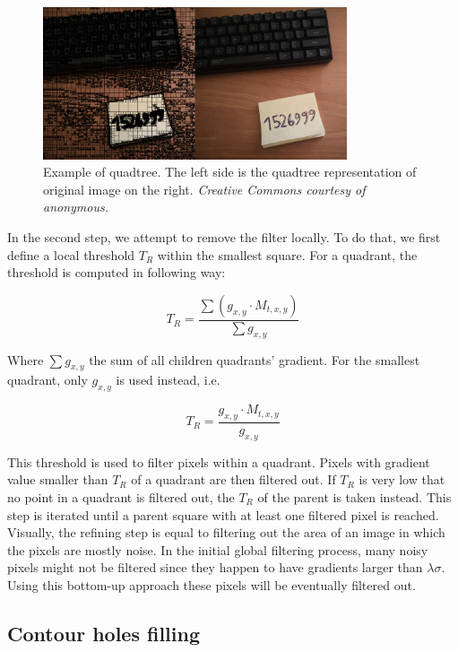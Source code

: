 \documentclass[pdftex,12pt,a4paper]{report}
\begin{document}
\begin{figure}[H]
\centering
\includegraphics[width=0.8\textwidth]{images/quadtree}
\caption[Example of quadtree]{Example of quadtree. The left side is the quadtree representation of original image on the right. \textit{Creative Commons courtesy of anonymous.}}
\label{fig:quadtree}
\end{figure}

In the second step, we attempt to remove the filter locally. To do that, we first define a local threshold $T_R$ within the smallest square. For a quadrant, the threshold is computed in following way:

\begin{equation}
T_R = \frac{\sum ( g_{x,y} \cdot M_{t, x, y} )}{\sum g_{x, y}}
\label{eq:local_threshold_rats}
\end{equation}

Where $\sum g_{x,y}$ the sum of all children quadrants' gradient. For the smallest quadrant, only $g_{x,y}$ is used instead, i.e.

\begin{equation}
T_R = \frac{g_{x,y} \cdot M_{t, x, y}}{g_{x, y}}
\label{eq:local_threshold_rats_smallest}
\end{equation}

This threshold is used to filter pixels within a quadrant. Pixels with gradient value smaller than $T_R$ of a quadrant are then filtered out. If $T_R$ is very low that no point in a quadrant is filtered out, the $T_R$ of the parent is taken instead. This step is iterated until a parent square with at least one filtered pixel is reached. Visually, the refining step is equal to filtering out the area of an image in which the pixels are mostly noise. In the initial global filtering process, many noisy pixels might not be filtered since they happen to have gradients larger than $\lambda \sigma$. Using this bottom-up approach these pixels will be eventually filtered out.

\subsection{Contour holes filling}
\label{subsection:holes_filling}
\end{document}
